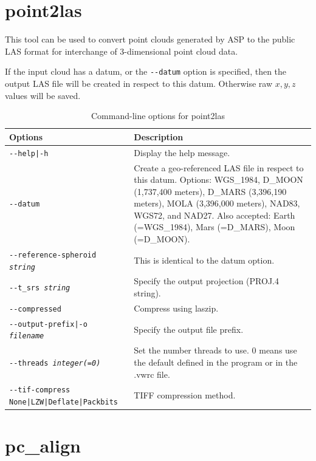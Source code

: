 \section{point2las}
\label{point2las}

This tool can be used to convert point clouds generated by ASP to the
public LAS format for interchange of 3-dimensional point cloud data.

If the input cloud has a datum, or the \texttt{-\/-datum} option is specified,
then the output LAS file will be created in respect to this datum. Otherwise
raw $x,y,z$ values will be saved.

\begin{longtable}{|l|p{10cm}|}
\caption{Command-line options for point2las}
\label{tbl:point2las}
\endfirsthead
\endhead
\endfoot
\endlastfoot
\hline
Options & Description \\ \hline \hline
\texttt{-\/-help|-h} & Display the help message.\\ \hline
\texttt{-\/-datum} & Create a geo-referenced LAS file in respect to this datum. Options: WGS\_1984, D\_MOON (1,737,400 meters), D\_MARS (3,396,190 meters), MOLA (3,396,000 meters), NAD83, WGS72, and NAD27. Also accepted: Earth (=WGS\_1984), Mars (=D\_MARS), Moon (=D\_MOON). \\ \hline
\texttt{-\/-reference-spheroid \textit{string}} & This is identical to the datum option. \\ \hline
\texttt{-\/-t\_srs \textit{string}} & Specify the output projection (PROJ.4 string). \\ \hline
\texttt{-\/-compressed} &
Compress using laszip. \\ \hline
\texttt{-\/-output-prefix|-o \textit{filename}} & Specify the output file prefix. \\ \hline
\texttt{-\/-threads \textit{integer(=0)}} & Set the number threads to use. 0 means use the default defined in the program or in the .vwrc file.\\ \hline
\texttt{-\/-tif-compress None|LZW|Deflate|Packbits} & TIFF compression method.\\ \hline
\end{longtable}

\section{pc\_align}
\label{pcalign}

